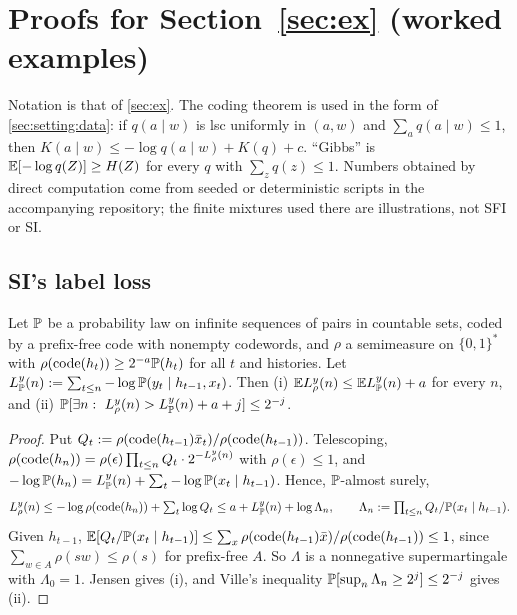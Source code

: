 \section{Proofs for Section~\ref{sec:ex} (worked examples)}\label{app:ex}

Notation is that of \cref{sec:ex}. The coding theorem is used in the form of \cref{sec:setting:data}: if $q(a\mid w)$ is lsc uniformly in $(a,w)$ and $\sum_aq(a\mid w)\le1$, then $K(a\mid w)\le-\log q(a\mid w)+K(q)+c$. ``Gibbs'' is $\mathbb{E}[-\log q(Z)]\ge H(Z)$ for every $q$ with $\sum_zq(z)\le1$. Numbers obtained by direct computation come from seeded or deterministic scripts in the accompanying repository; the finite mixtures used there are illustrations, not SFI or SI.

\subsection{SI's label loss}\label{app:ex:tools}

\begin{lemma}\label{lem:ex:silabel}
Let $\mathbb{P}$ be a probability law on infinite sequences of pairs in countable sets, coded by a prefix-free code with nonempty codewords, and $\rho$ a semimeasure on $\{0,1\}^*$ with $\rho(\operatorname{code}(h_t))\ge2^{-a}\mathbb{P}(h_t)$ for all $t$ and histories. Let $L^y_{\mathbb{P}}(n):=\sum_{t\le n}-\log\mathbb{P}(y_t\mid h_{t-1},x_t)$. Then (i) $\mathbb{E} L^y_\rho(n)\le\mathbb{E} L^y_{\mathbb{P}}(n)+a$ for every $n$, and (ii) $\Prob[\exists n:\ L^y_\rho(n)>L^y_\Prob(n)+a+j]\le2^{-j}$.
\end{lemma}

\begin{proof}
Put $Q_t:=\rho(\operatorname{code}(h_{t-1})\bar x_t)/\rho(\operatorname{code}(h_{t-1}))$. Telescoping, $\rho(\operatorname{code}(h_n))=\rho(\epsilon)\prod_{t\le n}Q_t\cdot2^{-L^y_\rho(n)}$ with $\rho(\epsilon)\le1$, and $-\log\mathbb{P}(h_n)=L^y_{\mathbb{P}}(n)+\sum_t-\log\mathbb{P}(x_t\mid h_{t-1})$. Hence, $\mathbb{P}$-almost surely,
\[L^y_\rho(n)\le-\log\rho(\operatorname{code}(h_n))+\textstyle\sum_t\log Q_t\le a+L^y_{\mathbb{P}}(n)+\log\Lambda_n,\qquad \Lambda_n:=\prod_{t\le n}Q_t/\mathbb{P}(x_t\mid h_{t-1}).\]
Given $h_{t-1}$, $\mathbb{E}[Q_t/\mathbb{P}(x_t\mid h_{t-1})]\le\sum_x\rho(\operatorname{code}(h_{t-1})\bar x)/\rho(\operatorname{code}(h_{t-1}))\le1$, since $\sum_{w\in A}\rho(sw)\le\rho(s)$ for prefix-free $A$. So $\Lambda$ is a nonnegative supermartingale with $\Lambda_0=1$. Jensen gives (i), and Ville's inequality $\mathbb{P}[\sup_n\Lambda_n\ge2^j]\le2^{-j}$ \citep{ville1939etude} gives (ii).
\end{proof}

